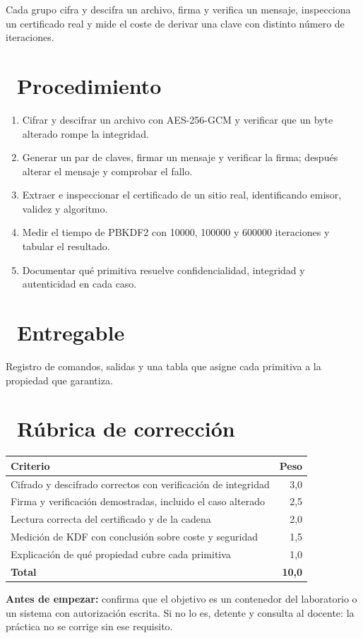 \documentclass[11pt,a4paper]{article}
\newcommand{\iconotexto}[2]{\textcolor{cyanNeon}{\faIcon{#1}}~#2}
\begin{document}
Cada grupo cifra y descifra un archivo, firma y verifica un mensaje, inspecciona un certificado real y mide el coste de derivar una clave con distinto número de iteraciones.


\section{\iconotexto{list-ol}{Procedimiento}}

\begin{enumerate}[leftmargin=1.4em,itemsep=2pt,topsep=3pt]
  \item Cifrar y descifrar un archivo con AES-256-GCM y verificar que un byte alterado rompe la integridad.
  \item Generar un par de claves, firmar un mensaje y verificar la firma; después alterar el mensaje y comprobar el fallo.
  \item Extraer e inspeccionar el certificado de un sitio real, identificando emisor, validez y algoritmo.
  \item Medir el tiempo de PBKDF2 con 10000, 100000 y 600000 iteraciones y tabular el resultado.
  \item Documentar qué primitiva resuelve confidencialidad, integridad y autenticidad en cada caso.
\end{enumerate}

\section{\iconotexto{box-open}{Entregable}}

Registro de comandos, salidas y una tabla que asigne cada primitiva a la propiedad que garantiza.

\section{\iconotexto{ruler-combined}{Rúbrica de corrección}}

\begin{tabularx}{\linewidth}{@{}X r@{}}
\toprule
Criterio & Peso\\
\midrule
Cifrado y descifrado correctos con verificación de integridad & 3,0 \\
Firma y verificación demostradas, incluido el caso alterado & 2,5 \\
Lectura correcta del certificado y de la cadena & 2,0 \\
Medición de KDF con conclusión sobre coste y seguridad & 1,5 \\
Explicación de qué propiedad cubre cada primitiva & 1,0 \\
\midrule
\textbf{Total} & \textbf{10,0}\\
\bottomrule
\end{tabularx}

\begin{tcolorbox}[cajaMejora]\textbf{Antes de empezar:} confirma que el objetivo es un contenedor del laboratorio o un sistema con autorización escrita. Si no lo es, detente y consulta al docente: la práctica no se corrige sin ese requisito.
\end{tcolorbox}
\end{document}
